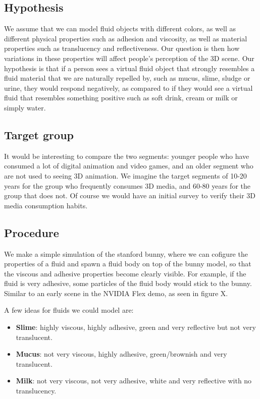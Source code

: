 \documentclass{article}
\begin{document}
\begin{multicols}{2}
        \subsection{Hypothesis}

            We assume that we can model fluid objects with different colors, as well as different physical properties such as adhesion and viscosity, as well as material properties such as translucency and reflectiveness.
            Our question is then how variations in these properties will affect people's perception of the 3D scene.
            Our hypothesis is that if a person sees a virtual fluid object that strongly resembles a fluid material that we are naturally repelled by, such as mucus, slime, sludge or urine, they would respond negatively, as compared to if they would see a virtual fluid that resembles something positive such as soft drink, cream or milk or simply water.

        \subsection{Target group}
        
            It would be interesting to compare the two segments: younger people who have consumed a lot of digital animation and video games, and an older segment who are not used to seeing 3D animation. We imagine the target segments of 10-20 years for the group who frequently consumes 3D media, and 60-80 years for the group that does not. Of course we would have an initial survey to verify their 3D media consumption habits.
            
        \subsection{Procedure}

            We make a simple simulation of the stanford bunny, where we can cofigure the properties of a fluid and spawn a fluid body on top of the bunny model, so that the viscous and adhesive properties become clearly visible. For example, if the fluid is very adhesive, some particles of the fluid body would stick to the bunny. Similar to an early scene in the NVIDIA Flex demo, as seen in figure X.

            A few ideas for fluids we could model are:

            \begin{itemize}
                \item \textbf{Slime}: highly viscous, highly adhesive, green and very reflective but not very translucent.
                \item \textbf{Mucus}: not very viscous, highly adhesive, green/brownish and very translucent.
                \item \textbf{Milk}: not very viscous, not very adhesive, white and very reflective with no translucency.
            \end{itemize}


\end{multicols}
\end{document}
